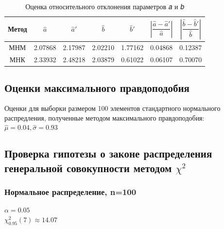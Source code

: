 \begin{table}[H]
	\begin{center}
		\begin{tabular}{|c|c|c|c|c|c|c|}
			\hline 
			Метод & $\hat{a}$ & $\hat{a}'$ & $\hat{b}$ & $\hat{b}'$ & $|\dfrac{\hat{a} - \hat{a}'}{\hat{a}}|$ & $|\dfrac{\hat{b} - \hat{b}'}{\hat{b}}|$ \\
			\hline \hline
			МНМ & 2.07868 & 2.17987 & 2.02210 & 1.77162 & 0.04868 & 0.12387\\
			\hline
			МНК & 2.33932 & 2.48218 & 2.03879 & 0.61022 & 0.06107 & 0.70070\\
			\hline
		\end{tabular}
	\end{center}
	\label{tab:relative_deviation}
	\caption{Оценка относительного отклонения параметров 𝑎 и 𝑏}
\end{table} 

\subsection{Оценки максимального правдоподобия}

Оценки для выборки размером 100 элементов стандартного нормального распредления, полученные методом максимального правдоподобия: \\
$\hat{\mu} = 0.04, \hat{\sigma} = 0.93 $

\subsection{Проверка гипотезы о законе распределения генеральной совокупности методом $\chi^2$ }

\subsubsection{Нормальное распределение, n=100}

$\alpha = 0.05$ \\
$\chi^{2}_{0.95}(7) \approx 14.07$ \\

